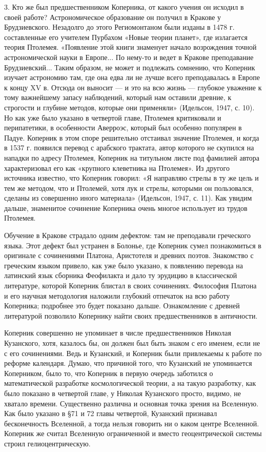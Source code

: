 3. Кто же был предшественником  Коперника, от какого учения он исходил
в своей  работе? Астрономическое  образование он  получил в  Кракове у
Брудзиевского.  Незадолго до  этого Региомонтаном  были изданы  в 1478
г.  составленные  его учителем  Пурбахом  «Новые  теории планет»,  где
излагается  теория Птолемея.  «Появление этой  книги знаменует  начало
возрождения  точной астрономической  науки  в Европе...  По нему-то  и
ведет в Кракове преподавание Брудзиевский... Таким образом, не может и
подлежать сомнению, что Коперник изучает  астрономию там, где она едва
ли  не лучше  всего преподавалась  в Европе  к концу  XV в.  Отсюда он
выносит --- и это на всю жизнь --- глубокое уважение к тому важнейшему
запасу наблюдений, который нам оставили древние, к строгости и глубине
методов, которые  они применяли» (Идельсон,  1947, с. 10). Но  как уже
было указано в четвертой главе, Птолемея критиковали и перипатетики, в
особенности Аверроэс, который был особенно популярен в Падуе. Коперник
в этом споре решительно отстаивал значение Птолемея, и когда в 1537 г.
появился перевод с  арабского трактата, автор которого  не скупился на
нападки по адресу  Птолемея, Коперник на титульном  листе под фамилией
автора характеризовал  его как  «крупного клеветника на  Птолемея». Из
другого источника известно, что  Коперник говорил: «Я направляю стрелы
в ту  же цель и  тем же  методом, что и  Птолемей, хотя лук  и стрелы,
которыми  он  пользовался,  сделаны  из  совершенно  иного  материала»
(Идельсон,  1947,  с. 11).  Как  увидим  дальше, знаменитое  сочинение
Коперника очень многое использует из трудов Птолемея.

Обучение  в  Кракове  страдало  одним  дефектом:  там  не  преподавали
греческого языка.  Этот дефект  был устранен  в Болонье,  где Коперник
сумел познакомиться  в оригинале  с сочинениями Платона,  Аристотеля и
древних поэтов.  Знакомство с греческим  языком привело, как  уже было
указано, к появлению перевода на  латинский язык сборника Феофилакта и
дало ту  эрудицию в классической литературе,  которой Коперник блистал
в  своих  сочинениях.  Философия  Платона и  его  научная  методология
наложили  глубокий отпечаток  на всю  работу Коперника;  подробнее это
будет показано  дальше. Ознакомление  с древней  литературой позволило
Копернику найти своих предшественников в античности.

Коперник  совершенно не  упоминает  в  числе предшественников  Николая
Кузанского, хотя, казалось бы, он должен был быть знаком с его именем,
если  не  с  его  сочинениями.  Ведь  и  Кузанский,  и  Коперник  были
привлекаемы к работе  по реформе календаря. Думаю,  что причиной того,
что  Кузанский не  упоминается  Коперником, было  то,  что Коперник  в
первую очередь  заботился о математической  разработке космологической
теории, а на такую разработку, как  было показано в четвертой главе, у
Николая  Кузанского просто,  видимо, не  хватало времени.  Существенно
различна и основная точка зрения на  Вселенную. Как было указано в §71
и 72  главы четвертой, Кузанский признавал  бесконечность Вселенной, а
тогда  нельзя  говорить  ни  о каком  центре  Вселенной.  Коперник  же
считал Вселенную ограниченной и  вместо геоцентрической системы строил
гелиоцентрическую.


